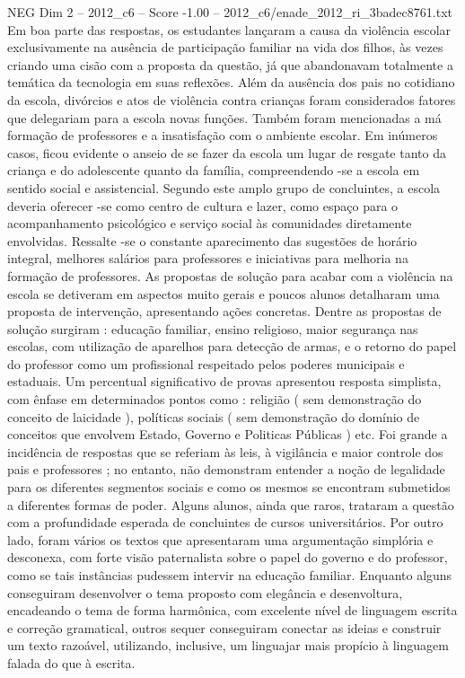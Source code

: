 \begin{textsample}{NEG Dim 2 – 2012\_c6 – Score -1.00 – 2012\_c6/enade\_2012\_ri\_3badec8761.txt}
Em boa parte das respostas, os estudantes lançaram a causa da violência escolar exclusivamente na ausência de participação familiar na vida dos filhos, às vezes criando uma cisão com a proposta da questão, já que abandonavam totalmente a temática da tecnologia em suas reflexões.
Além da ausência dos pais no cotidiano da escola, divórcios e atos de violência contra crianças foram considerados fatores que delegariam para a escola novas funções.
Também foram mencionadas a má formação de professores e a insatisfação com o ambiente escolar.
Em inúmeros casos, ficou evidente o anseio de se fazer da escola um lugar de resgate tanto da criança e do adolescente quanto da família, compreendendo -se a escola em sentido social e assistencial.
Segundo este amplo grupo de concluintes, a escola deveria oferecer -se como centro de cultura e lazer, como espaço para o acompanhamento psicológico e serviço social às comunidades diretamente envolvidas.
Ressalte -se o constante aparecimento das sugestões de horário integral, melhores salários para professores e iniciativas para melhoria na formação de professores.
As propostas de solução para acabar com a violência na escola se detiveram em aspectos muito gerais e poucos alunos detalharam uma proposta de intervenção, apresentando ações concretas.
Dentre as propostas de solução surgiram : educação familiar, ensino religioso, maior segurança nas escolas, com utilização de aparelhos para detecção de armas, e o retorno do papel do professor como um profissional respeitado pelos poderes municipais e estaduais.
Um percentual significativo de provas apresentou resposta simplista, com ênfase em determinados pontos como : religião ( sem demonstração do conceito de laicidade ), políticas sociais ( sem demonstração do domínio de conceitos que envolvem Estado, Governo e Politicas Públicas ) etc.
Foi grande a incidência de respostas que se referiam às leis, à vigilância e maior controle dos pais e professores ; no entanto, não demonstram entender a noção de legalidade para os diferentes segmentos sociais e como os mesmos se encontram submetidos a diferentes formas de poder.
Alguns alunos, ainda que raros, trataram a questão com a profundidade esperada de concluintes de cursos universitários.
Por outro lado, foram vários os textos que apresentaram uma argumentação simplória e desconexa, com forte visão paternalista sobre o papel do governo e do professor, como se tais instâncias pudessem intervir na educação familiar.
Enquanto alguns conseguiram desenvolver o tema proposto com elegância e desenvoltura, encadeando o tema de forma harmônica, com excelente nível de linguagem escrita e correção gramatical, outros sequer conseguiram conectar as ideias e construir um texto razoável, utilizando, inclusive, um linguajar mais propício à linguagem falada do que à escrita.

\end{textsample}
